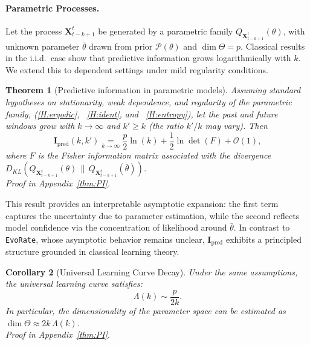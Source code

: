 \documentclass{article}
\newtheorem{theorem}{Theorem}[section]
\newtheorem{corollary}[theorem]{Corollary}
\begin{document}
\paragraph{Parametric Processes.}

Let the process $\mathbf{X}_{t-k+1}^{t}$ be generated by a parametric family $Q_{\mathbf{X}_{t-k+1}^{t}}(\theta)$, with unknown parameter $\bar{\theta}$ drawn from prior $\mathcal{P}(\theta)$ and $\dim\Theta = p$. Classical results in the i.i.d.\ case \cite{bialek1999predictive, clarke1990information} show that predictive information grows logarithmically with $k$. We extend this to dependent settings under mild regularity conditions.

\begin{theorem}[Predictive information in parametric models]
\label{thr:evoPredLimitParametrizedProcess}
Assuming standard hypotheses on stationarity, weak dependence, and regularity of the parametric family, (\ref{H:ergodic}, ~\ref{H:ident}, and ~\ref{H:entropy}), let the past and future windows grow with $k\!\to\!\infty$ and
$k'\!\ge\!k$ (the ratio $k'/k$ may vary).
Then
\begin{equation*}\label{eq:evoPredLimitParametrizedProcess}
   \mathbf{I}_{\text{pred}}(k,k') \underset{k\to\infty}{=} \frac{p}{2}\ln(k) + \frac{1}{2} \ln\det(F) + \mathcal{O}(1),
\end{equation*}
where $F$ is the Fisher information matrix associated with the divergence $D_{KL}(Q_{\mathbf{X}_{t-k+1}^{t}}(\theta) \,\|\, Q_{\mathbf{X}_{t-k+1}^{t}}(\bar{\theta}))$.\\
\textit{Proof in Appendix~\ref{thm:PI}.}
\end{theorem}

This result provides an interpretable asymptotic expansion: the first term captures the uncertainty due to parameter estimation, while the second reflects model confidence via the concentration of likelihood around $\bar{\theta}$. In contrast to \texttt{EvoRate}, whose asymptotic behavior remains unclear, $\mathbf{I}_{\text{pred}}$ exhibits a principled structure grounded in classical learning theory.

\begin{corollary}[Universal Learning Curve Decay]
\label{cor:universal_learning_curve_parametric}
Under the same assumptions, the universal learning curve satisfies:
\[
\Lambda(k) \sim \frac{p}{2k}.
\]
In particular, the dimensionality of the parameter space can be estimated as $\dim \Theta \approx 2k\,\Lambda(k)$.\\
\textit{Proof in Appendix~\ref{thm:PI}.}
\end{corollary}
\end{document}
